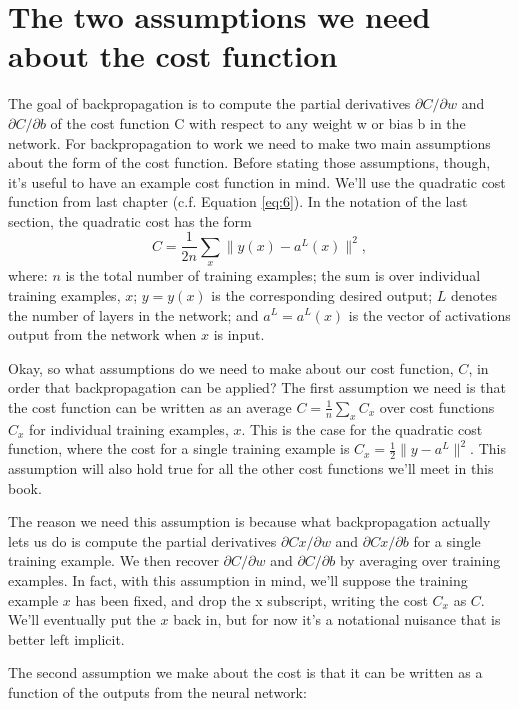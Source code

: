 \documentclass[a4paper,twoside,10pt]{book}
\begin{document}
\section{The two assumptions we need about the cost function}
The goal of backpropagation is to compute the partial derivatives $\partial{}C/\partial{}w$ and $\partial{}C/\partial{}b$ of the cost function C with respect to any weight w or bias b in the network. For backpropagation to work we need to make two main assumptions about the form of the cost function. Before stating those assumptions, though, it's useful to have an example cost function in mind. We'll use the quadratic cost function from last chapter (c.f. Equation \ref{eq:6}). In the notation of the last section, the quadratic cost has the form
\begin{equation}
C = \frac{1}{2n} \sum_x \|y(x)-a^L(x)\|^2,
\label{eq:26}
\end{equation}
where: $n$ is the total number of training examples; the sum is over individual training examples, $x$; $y=y(x)$ is the corresponding desired output; $L$ denotes the number of layers in the network; and $a^L=a^L(x)$ is the vector of activations output from the network when $x$ is input.

Okay, so what assumptions do we need to make about our cost function, $C$, in order that backpropagation can be applied? The first assumption we need is that the cost function can be written as an average $C=\frac1n\sum_xC_x$ over cost functions $C_x$ for individual training examples, $x$. This is the case for the quadratic cost function, where the cost for a single training example is $C_x=\frac12\|y-a^L\|^2$. This assumption will also hold true for all the other cost functions we'll meet in this book.

The reason we need this assumption is because what backpropagation actually lets us do is compute the partial derivatives $\partial{}Cx/\partial{}w$ and $\partial{}Cx/\partial{}b$ for a single training example. We then recover $\partial{}C/\partial{}w$ and $\partial{}C/\partial{}b$ by averaging over training examples. In fact, with this assumption in mind, we'll suppose the training example $x$ has been fixed, and drop the x subscript, writing the cost $C_x$ as $C$. We'll eventually put the $x$ back in, but for now it's a notational nuisance that is better left implicit.

The second assumption we make about the cost is that it can be written as a function of the outputs from the neural network:
\end{document}
